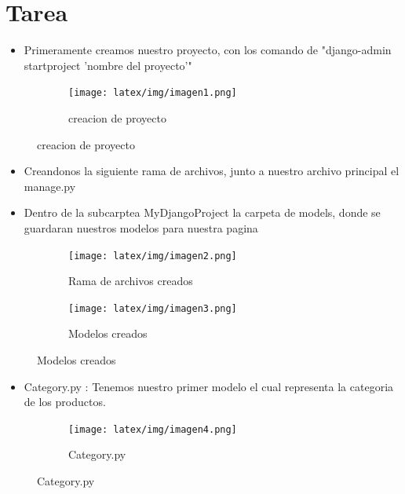 \documentclass{article}
\begin{document}
	\section{Tarea}
	\begin{itemize}		
		\item Primeramente creamos nuestro proyecto, con los comando de "django-admin startproject 'nombre del proyecto'"
	\end{itemize}
    \begin{figure}[h]
        \begin{subfigure}{0.5\textwidth}
            \centering
            \texttt{[image: latex/img/imagen1.png]}
            \caption{creacion de proyecto}
            \label{fig:primer}
        \end{subfigure}
    \end{figure}
    \newpage
        \begin{itemize}		
		\item Creandonos la siguiente rama de archivos, junto a nuestro archivo principal el manage.py
            \item Dentro de la subcarptea MyDjangoProject la carpeta de models, donde se guardaran nuestros modelos para nuestra pagina
	\end{itemize}
         \begin{figure}[h]
        \begin{subfigure}{0.5\textwidth}
            \centering
            \texttt{[image: latex/img/imagen2.png]}
            \caption{Rama de archivos creados}
            \label{fig:primer}
        \end{subfigure}
        \begin{subfigure}{0.5\textwidth}
            \centering
            \texttt{[image: latex/img/imagen3.png]}
            \caption{Modelos creados}
            \label{fig:primer}
        \end{subfigure}
    \end{figure}
    \begin{itemize}		
		\item Category.py : Tenemos nuestro primer modelo el cual representa  la categoria de los productos.
	\end{itemize}
         \begin{figure}[h]
        \begin{subfigure}{0.5\textwidth}
            \centering
            \texttt{[image: latex/img/imagen4.png]}
            \caption{Category.py}
            \label{fig:primer}
        \end{subfigure}
    \end{figure}
\end{document}
